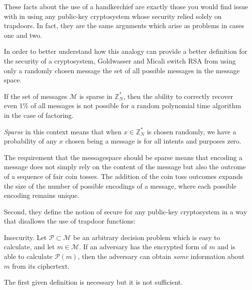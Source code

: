\bigskip


These facts about the use of a handkerchief are exactly those you would find issue with in using any public-key cryptosystem whose security relied solely on trapdoors. In fact, they are the same arguments which arise as problems in cases one and two. 

\bigskip
In order to better understand how this analogy can provide a better definition for the security of a cryptosystem, Goldwasser and Micali switch RSA from using only a randomly chosen message the set of all possible messages in the message space. 

\medskip

\begin{cla}
    If the set of messages $\mathcal{M}$ is sparse in $\mathbb{Z}_{N}^{\ast}$, then the ability to correctly recover even 1\% of all messages is not possible for a random polynomial time algorithm in the case of factoring.
\end{cla}

\medskip

\emph{Sparse} in this context means that when $x \in \mathbb{Z}_{N}^{*}$ is chosen randomly, we have a probability of any $x$ chosen being a message is for all intents and purposes zero. 

\medskip

The requirement that the messagespace should be sparse means that encoding a message does not simply rely on the content of the message but also the outcome of a sequence of fair coin tosses. The addition of the coin toss outcomes expands the size of the number of possible encodings of a message, where each possible encoding remains unique. 

\bigskip

Second, they define the notion of secure for any public-key cryptosystem in a way that disallows the use of trapdoor functions:

\bigskip

\begin{defn}{Insecurity. }
	Let $\mathcal{P} \subset \mathcal{M}$  be an arbitrary decision problem which is easy to calculate, and let $m \in \mathcal{M}$. If an adversary has the encrypted form of $m$ and is able to calculate $\mathcal{P}(m)$, then the adversary can obtain \emph{some} information about $m$ from its ciphertext.
\end{defn}

\bigskip

The first given definition is necessary but it is not sufficient.

